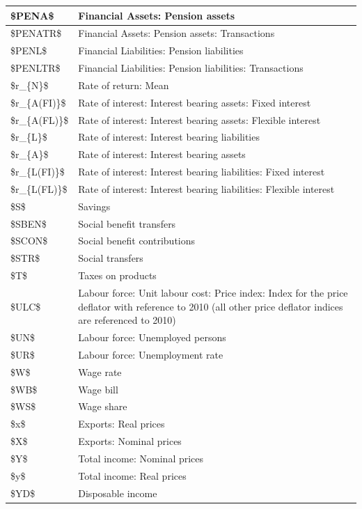 \documentclass[
]{book}
\begin{document}
\begin{tabular}[t]{l|l}
\hline
\$PENA\$ & Financial Assets: Pension assets\\
\hline
\$PENATR\$ & Financial Assets: Pension assets: Transactions\\
\hline
\$PENL\$ & Financial Liabilities: Pension liabilities\\
\hline
\$PENLTR\$ & Financial Liabilities: Pension liabilities: Transactions\\
\hline
\$r\_\{N\}\$ & Rate of return: Mean\\
\hline
\$r\_\{A(FI)\}\$ & Rate of interest: Interest bearing assets: Fixed interest\\
\hline
\$r\_\{A(FL)\}\$ & Rate of interest: Interest bearing assets: Flexible interest\\
\hline
\$r\_\{L\}\$ & Rate of interest: Interest bearing liabilities\\
\hline
\$r\_\{A\}\$ & Rate of interest: Interest bearing assets\\
\hline
\$r\_\{L(FI)\}\$ & Rate of interest: Interest bearing liabilities: Fixed interest\\
\hline
\$r\_\{L(FL)\}\$ & Rate of interest: Interest bearing liabilities: Flexible interest\\
\hline
\$S\$ & Savings\\
\hline
\$SBEN\$ & Social benefit transfers\\
\hline
\$SCON\$ & Social benefit contributions\\
\hline
\$STR\$ & Social transfers\\
\hline
\$T\$ & Taxes on products\\
\hline
\$ULC\$ & Labour force: Unit labour cost: Price index: Index for the price deflator with reference to 2010 (all other price deflator indices are referenced to 2010)\\
\hline
\$UN\$ & Labour force: Unemployed persons\\
\hline
\$UR\$ & Labour force: Unemployment rate\\
\hline
\$W\$ & Wage rate\\
\hline
\$WB\$ & Wage bill\\
\hline
\$WS\$ & Wage share\\
\hline
\$x\$ & Exports: Real prices\\
\hline
\$X\$ & Exports: Nominal prices\\
\hline
\$Y\$ & Total income: Nominal prices\\
\hline
\$y\$ & Total income: Real prices\\
\hline
\$YD\$ & Disposable income\\
\hline
\end{tabular}
\end{document}
